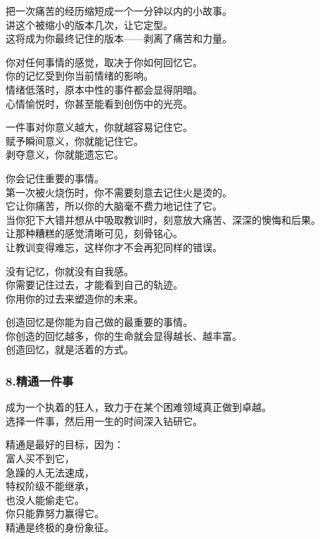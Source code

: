 \documentclass[
]{article}
\begin{document}
把一次痛苦的经历缩短成一个一分钟以内的小故事。\\
讲这个被缩小的版本几次，让它定型。\\
这将成为你最终记住的版本------剥离了痛苦和力量。

你对任何事情的感觉，取决于你如何回忆它。\\
你的记忆受到你当前情绪的影响。\\
情绪低落时，原本中性的事件都会显得阴暗。\\
心情愉悦时，你甚至能看到创伤中的光亮。

一件事对你意义越大，你就越容易记住它。\\
赋予瞬间意义，你就能记住它。\\
剥夺意义，你就能遗忘它。

你会记住重要的事情。\\
第一次被火烧伤时，你不需要刻意去记住火是烫的。\\
它让你痛苦，所以你的大脑毫不费力地记住了它。\\
当你犯下大错并想从中吸取教训时，刻意放大痛苦、深深的懊悔和后果。\\
让那种糟糕的感觉清晰可见，刻骨铭心。\\
让教训变得难忘，这样你才不会再犯同样的错误。

没有记忆，你就没有自我感。\\
你需要记住过去，才能看到自己的轨迹。\\
你用你的过去来塑造你的未来。

创造回忆是你能为自己做的最重要的事情。\\
你创造的回忆越多，你的生命就会显得越长、越丰富。\\
创造回忆，就是活着的方式。

\subsubsection{8.精通一件事}\label{8ux7cbeux901aux4e00ux4ef6ux4e8b}

成为一个执着的狂人，致力于在某个困难领域真正做到卓越。\\
选择一件事，然后用一生的时间深入钻研它。

精通是最好的目标，因为：\\
富人买不到它，\\
急躁的人无法速成，\\
特权阶级不能继承，\\
也没人能偷走它。\\
你只能靠努力赢得它。\\
精通是终极的身份象征。
\end{document}
